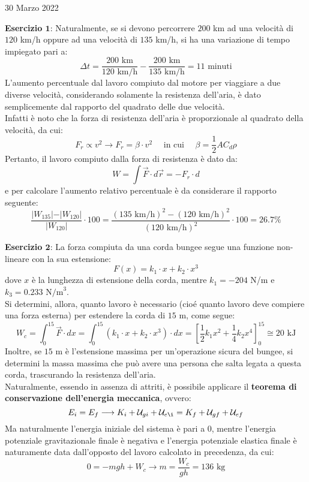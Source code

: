 \documentclass[a4paper]{extarticle}
\begin{document}
\newpage
\noindent
\begin{center}
  30 Marzo 2022
\end{center}
\textbf{Esercizio $\boldsymbol{1}$}: Naturalmente, se si devono percorrere $200$ km ad una velocità di $120$ km/h oppure ad una velocità di $135$ km/h, si ha una variazione di tempo impiegato pari a:
\[\Delta t = \frac{200 \text{ km}}{120 \text{ km/h}} - \frac{200 \text{ km}}{135 \text{ km/h}} = 11 \text{ minuti}\]
L'aumento percentuale dal lavoro compiuto dal motore per viaggiare a due diverse velocità, considerando solamente la resistenza dell'aria, è dato semplicemente dal rapporto del quadrato delle due velocità.\\
Infatti è noto che la forza di resistenza dell'aria è proporzionale al quadrato della velocità, da cui:
\[F_r \propto v^2 \longrightarrow F_r = \beta \cdot v^2 \hspace{1em} \text{ in cui } \hspace{1em} \beta=\frac{1}{2}AC_d\rho\]
Pertanto, il lavoro compiuto dalla forza di resistenza è dato da:
\[W = \int \vec F \cdot d \vec r = - F_r \cdot d\]
e per calcolare l'aumento relativo percentuale è da considerare il rapporto seguente:
\[\frac{\vert W_{135} \vert - \vert W_{120} \vert}{\vert W_{120} \vert} \cdot 100 = \frac{(135 \text{ km/h})^2 - (120 \text{ km/h})^2}{(120 \text{ km/h})^2} \cdot 100 = 26.7 \%\]

\vspace{1em}
\noindent
\textbf{Esercizio $\boldsymbol{2}$}: La forza compiuta da una corda bungee segue una funzione non-lineare con la sua estensione:
\[F(x) = k_1 \cdot x + k_2 \cdot x^3\]
dove $x$ è la lunghezza di estensione della corda, mentre $k_1=-204$ N/m e $k_3 = 0.233 \text{ N/m}^3$.\\
Si determini, allora, quanto lavoro è necessario (cioé quanto lavoro deve compiere una forza esterna) per estendere la corda di $15$ m, come segue:
\[W_{c} = \int_0^{15} \vec F \cdot d x =  \int_0^{15} \left(k_1 \cdot x + k_2 \cdot x^3 \right) \cdot d x = \left[\frac{1}{2}k_1x^2 + \frac{1}{4}k_2 x^4 \right]_0^15 \cong 20 \text{ kJ}\]
Inoltre, se $15$ m è l'estensione massima per un'operazione sicura del bungee, si determini la massa massima che può avere una persona che salta legata a questa corda, trascurando la resistenza dell'aria.\\
Naturalmente, essendo in assenza di attriti, è possibile applicare il \textbf{teorema di conservazione dell'energia meccanica}, ovvero:
\[E_i = E_f \longrightarrow K_i + \mathcal{U}_{gi} + \mathcal{U}_{e\i} = K_f + \mathcal{U}_{gf} + \mathcal{U}_{ef}\]
Ma naturalmente l'energia iniziale del sistema è pari a $0$, mentre l'energia potenziale gravitazionale finale è negativa e l'energia potenziale elastica finale è naturamente data dall'opposto del lavoro calcolato in precedenza, da cui:
\[0 = -mgh + W_c \longrightarrow m = \frac{W_c}{gh} = 136 \text{ kg}\]
\end{document}
